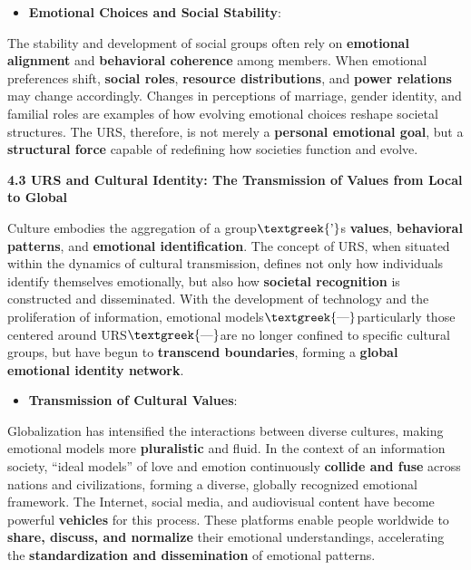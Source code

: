 \documentclass[a4paper]{article}
\begin{document}
\begin{itemize}[resume*=listWWNumx]
\item \textbf{Emotional Choices and Social Stability}:
\end{itemize}
The stability and development of social groups often rely on \textbf{emotional alignment} and \textbf{behavioral
coherence} among members. When emotional preferences shift, \textbf{social roles}, \textbf{resource distributions}, and
\textbf{power relations} may change accordingly. Changes in perceptions of marriage, gender identity, and familial
roles are examples of how evolving emotional choices reshape societal structures. The URS, therefore, is not merely a
\textbf{personal emotional goal}, but a \textbf{structural force} capable of redefining how societies function and
evolve.

\textbf{4.3 URS and Cultural Identity: The Transmission of Values from Local to Global}

Culture embodies the aggregation of a group$\text{\textgreek{’}}$s \textbf{values}, \textbf{behavioral patterns}, and
\textbf{emotional identification}. The concept of URS, when situated within the dynamics of cultural transmission,
defines not only how individuals identify themselves emotionally, but also how \textbf{societal recognition} is
constructed and disseminated. With the development of technology and the proliferation of information, emotional
models$\text{\textgreek{—}}$particularly those centered around URS$\text{\textgreek{—}}$are no longer confined to
specific cultural groups, but have begun to \textbf{transcend boundaries}, forming a \textbf{global emotional identity
network}.

\begin{itemize}[series=listWWNumxi,label=[F0B7?]]
\item \textbf{Transmission of Cultural Values}:
\end{itemize}
Globalization has intensified the interactions between diverse cultures, making emotional models more
\textbf{pluralistic} and fluid. In the context of an information society, “ideal models” of love and emotion
continuously \textbf{collide and fuse} across nations and civilizations, forming a diverse, globally recognized
emotional framework. The Internet, social media, and audiovisual content have become powerful \textbf{vehicles} for
this process. These platforms enable people worldwide to \textbf{share, discuss, and normalize} their emotional
understandings, accelerating the \textbf{standardization and dissemination} of emotional patterns.
\end{document}
